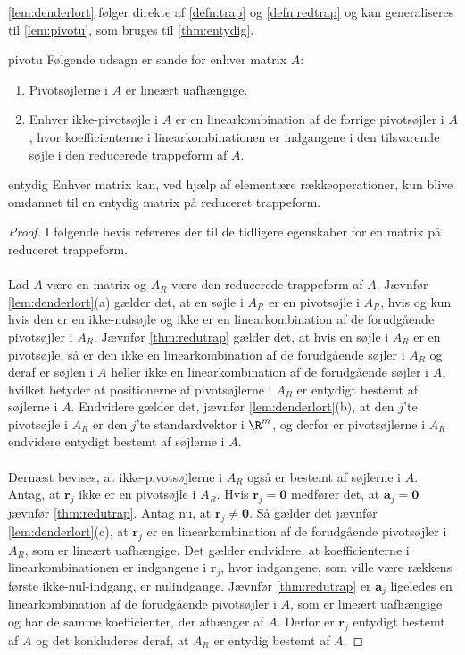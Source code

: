 \noindent
%
\ref{lem:denderlort} følger direkte af \ref{defn:trap} og \ref{defn:redtrap}
og kan generaliseres til \ref{lem:pivotu}, som bruges til \ref{thm:entydig}.
%
\begin{lem}{}{pivotu}
Følgende udsagn er sande for enhver matrix $A$: 
\begin{enumerate}[label=(\alph*)]
\item Pivotsøjlerne i $A$ er lineært uafhængige. 
\item Enhver ikke-pivotsøjle i $A$ er en linearkombination af de forrige pivotsøjler i $A$, hvor koefficienterne i linearkombinationen er indgangene i den tilsvarende søjle i den reducerede trappeform af $A$. 
\end{enumerate} 
\end{lem}
%
\begin{thm}{}{entydig}
Enhver matrix kan, ved hjælp af elementære rækkeoperationer, kun blive omdannet til en entydig matrix på reduceret trappeform.
\end{thm}
%
\begin{proof}
I følgende bevis refereres der til de tidligere egenskaber for en matrix på reduceret trappeform.\\\\
Lad $A$ være en matrix og $A_R$ være den reducerede trappeform af $A$. 
Jævnfør \ref{lem:denderlort}(a) gælder det, at en søjle i $A_R$ er en pivotsøjle i $A_R$, hvis og kun hvis den er en ikke-nulsøjle og ikke er en linearkombination af de forudgående pivotsøjler i $A_R$. 
Jævnfør \ref{thm:redutrap} gælder det, at hvis en søjle i $A_R$ er en pivotsøjle, så er den ikke en linearkombination af de forudgående søjler i $A_R$ og deraf er søjlen i $A$ heller ikke en linearkombination af de forudgående  søjler i $A$, hvilket betyder at positionerne af pivotsøjlerne i $A_R$ er entydigt bestemt af søjlerne i $A$. 
Endvidere gælder det, jævnfør \ref{lem:denderlort}(b), at den $j$'te pivotsøjle i $A_R$ er den $j$'te standardvektor i $\R^m$, og derfor er pivotsøjlerne i $A_R$ endvidere entydigt bestemt af søjlerne i $A$. \\\\
Dernæst bevises, at ikke-pivotsøjlerne i $A_R$ også er bestemt af søjlerne i $A$. 
Antag, at $\textbf{r}_j$ ikke er en pivotsøjle i $A_R$.
Hvis $\textbf{r}_j = \textbf{0}$ medfører det, at $\textbf{a}_j = \textbf{0}$ jævnfør \ref{thm:redutrap}. 
Antag nu, at $\textbf{r}_j \neq \textbf{0}$.
Så gælder det jævnfør \ref{lem:denderlort}(c), at $\textbf{r}_j$ er en linearkombination af de forudgående pivotsøjler i $A_R$, som er lineært uafhængige. 
Det gælder endvidere, at koefficienterne i linearkombinationen er indgangene i $\textbf{r}_j$, hvor indgangene, som ville være rækkens første ikke-nul-indgang, er nulindgange.
Jævnfør \ref{thm:redutrap} er $\textbf{a}_j$ ligeledes en linearkombination af de forudgående pivotsøjler i $A$, som er lineært uafhængige og har de samme koefficienter, der afhænger af $A$. 
Derfor er $\textbf{r}_j$ entydigt bestemt af $A$ og det konkluderes deraf, at $A_R$ er entydig bestemt af $A$. 
\end{proof}
